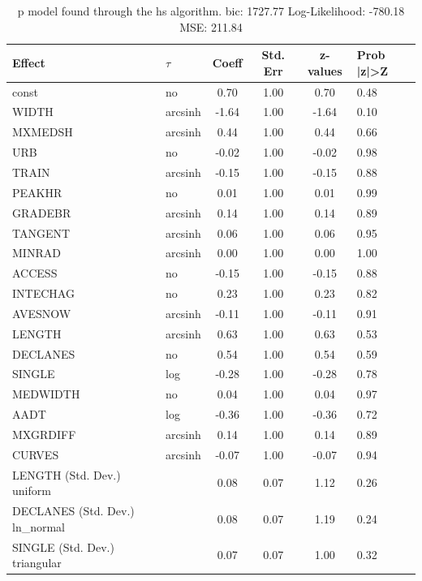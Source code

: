 \begin{table}
	\caption{p model found through the hs algorithm. bic: 1727.77 Log-Likelihood: -780.18 MSE: 211.84}
	\begin{center}
		\begin{tabular}{|l|l|c|c|c|l|}
			\hline
			Effect & $\tau$ & Coeff & Std. Err & z-values & Prob |z|>Z \\
			\hline
			const & no & 0.70 & 1.00 & 0.70 & 0.48 \\
			\hline
			WIDTH & arcsinh & -1.64 & 1.00 & -1.64 & 0.10 \\
			\hline
			MXMEDSH & arcsinh & 0.44 & 1.00 & 0.44 & 0.66 \\
			\hline
			URB & no & -0.02 & 1.00 & -0.02 & 0.98 \\
			\hline
			TRAIN & arcsinh & -0.15 & 1.00 & -0.15 & 0.88 \\
			\hline
			PEAKHR & no & 0.01 & 1.00 & 0.01 & 0.99 \\
			\hline
			GRADEBR & arcsinh & 0.14 & 1.00 & 0.14 & 0.89 \\
			\hline
			TANGENT & arcsinh & 0.06 & 1.00 & 0.06 & 0.95 \\
			\hline
			MINRAD & arcsinh & 0.00 & 1.00 & 0.00 & 1.00 \\
			\hline
			ACCESS & no & -0.15 & 1.00 & -0.15 & 0.88 \\
			\hline
			INTECHAG & no & 0.23 & 1.00 & 0.23 & 0.82 \\
			\hline
			AVESNOW & arcsinh & -0.11 & 1.00 & -0.11 & 0.91 \\
			\hline
			LENGTH & arcsinh & 0.63 & 1.00 & 0.63 & 0.53 \\
			\hline
			DECLANES & no & 0.54 & 1.00 & 0.54 & 0.59 \\
			\hline
			SINGLE & log & -0.28 & 1.00 & -0.28 & 0.78 \\
			\hline
			MEDWIDTH & no & 0.04 & 1.00 & 0.04 & 0.97 \\
			\hline
			AADT & log & -0.36 & 1.00 & -0.36 & 0.72 \\
			\hline
			MXGRDIFF & arcsinh & 0.14 & 1.00 & 0.14 & 0.89 \\
			\hline
			CURVES & arcsinh & -0.07 & 1.00 & -0.07 & 0.94 \\
			\hline
			LENGTH (Std. Dev.) uniform &  & 0.08 & 0.07 & 1.12 & 0.26 \\
			\hline
			DECLANES (Std. Dev.) ln_normal &  & 0.08 & 0.07 & 1.19 & 0.24 \\
			\hline
			SINGLE (Std. Dev.) triangular &  & 0.07 & 0.07 & 1.00 & 0.32 \\

\end{tabular}
\end{center}
\end{table}
